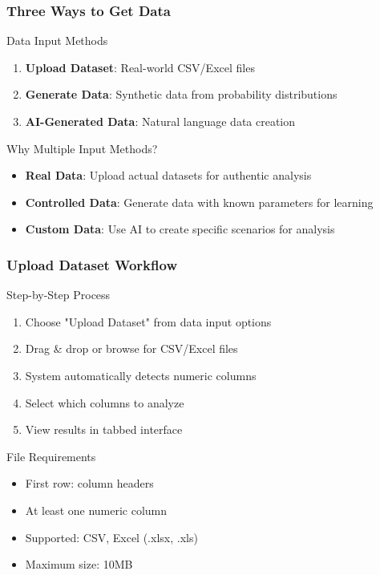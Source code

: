 \documentclass[aspectratio=169]{beamer}
\begin{document}
\begin{frame}
\frametitle{Three Ways to Get Data}
\begin{alertblock}{Data Input Methods}
\begin{enumerate}
\item \textbf{Upload Dataset}: Real-world CSV/Excel files
\item \textbf{Generate Data}: Synthetic data from probability distributions
\item \textbf{AI-Generated Data}: Natural language data creation
\end{enumerate}
\end{alertblock}

\begin{exampleblock}{Why Multiple Input Methods?}
\begin{itemize}
\item \textbf{Real Data}: Upload actual datasets for authentic analysis
\item \textbf{Controlled Data}: Generate data with known parameters for learning
\item \textbf{Custom Data}: Use AI to create specific scenarios for analysis
\end{itemize}
\end{exampleblock}
\end{frame}

\begin{frame}
\frametitle{Upload Dataset Workflow}
\begin{alertblock}{Step-by-Step Process}
\begin{enumerate}
\item Choose "Upload Dataset" from data input options
\item Drag \& drop or browse for CSV/Excel files
\item System automatically detects numeric columns
\item Select which columns to analyze
\item View results in tabbed interface
\end{enumerate}
\end{alertblock}

\begin{exampleblock}{File Requirements}
\begin{itemize}
\item First row: column headers
\item At least one numeric column
\item Supported: CSV, Excel (.xlsx, .xls)
\item Maximum size: 10MB
\end{itemize}
\end{exampleblock}
\end{frame}
\end{document}
